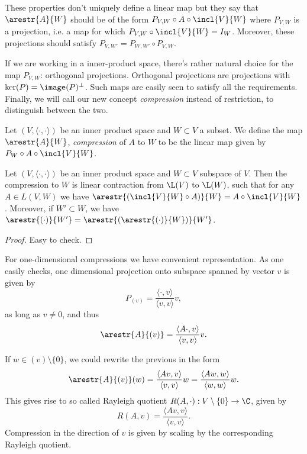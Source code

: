 These properties don't uniquely define a linear map but they say that $\arestr{A}{W}$ should be of the form $P_{V, W} \circ A \circ \incl{V}{W}$ where $P_{V, W}$ is a projection, i.e. a map for which $P_{V, W} \circ \incl{V}{W} = I_{W}$. Moreover, these projections should satisfy $P_{V, W'} = P_{W, W'} \circ P_{V, W}$.

If we are working in a inner-product space, there's rather natural choice for the map $P_{V, W}$: orthogonal projections. Orthogonal projections are projections with $\ker(P) = \image(P)^{\perp}$. Such maps are easily seen to satisfy all the requirements. Finally, we will call our new concept \textit{compression} instead of restriction, to distinguish between the two.

\begin{maar}
	Let $(V, \langle \cdot, \cdot \rangle )$ be an inner product space and $W \subset V$ a subset. We define the map $\arestr{A}{W}$, \textit{compression} of $A$ to $W$ to be the linear map given by $P_{W} \circ A \circ \incl{V}{W}$.
\end{maar}

\begin{lause}
	Let $(V, \langle \cdot, \cdot \rangle)$ be an inner product space and $W \subset V$ subspace of $V$. Then the compression to $W$ is linear contraction from $\L(V)$ to $\L(W)$, such that for any $A \in L(V, W)$ we have $\arestr{(\incl{V}{W} \circ A)}{W} = A \circ \incl{V}{W}$. Moreover, if $W' \subset W$, we have $\arestr{(\cdot)}{W'} = \arestr{(\arestr{(\cdot)}{W})}{W'}$.
\end{lause}
\begin{proof}
	Easy to check.
\end{proof}

For one-dimensional compressions we have convenient representation. As one easily checks, one dimensional projection onto subspace spanned by vector $v$ is given by
\[
	P_{(v)} = \frac{\langle \cdot, v \rangle}{\langle v, v \rangle} v,
\]
as long as $v \neq 0$, and thus
\[
	\arestr{A}{(v)} = \frac{\langle A \cdot, v \rangle}{\langle v, v \rangle} v.
\]

If $w \in (v) \setminus \{0\}$, we could rewrite the previous in the form
\[
	\arestr{A}{(v)}(w) = \frac{\langle A v, v\rangle}{\langle v, v\rangle} w = \frac{\langle A w, w\rangle}{\langle w, w \rangle} w.
\]
This gives rise to so called Rayleigh quotient $R(A, \cdot) : V \setminus \{0\} \to \C$, given by
\[
	R(A, v) = \frac{\langle A v, v \rangle}{\langle v, v \rangle}.
\]
Compression in the direction of $v$ is given by scaling by the corresponding Rayleigh quotient.

